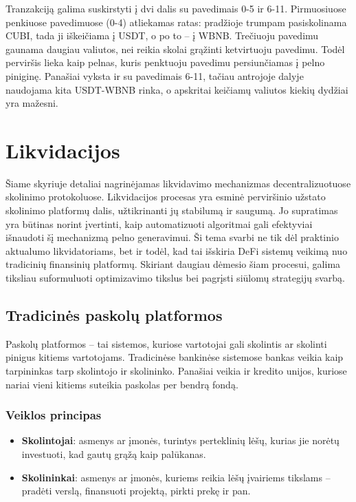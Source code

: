 \documentclass[]{VUMIFTemplateClass}
\begin{document}
Tranzakciją galima suskirstyti į dvi dalis su pavedimais 0-5 ir 6-11. Pirmuosiuose penkiuose pavedimuose (0-4) atliekamas ratas: pradžioje trumpam pasiskolinama CUBI, tada ji iškeičiama į USDT, o po to -- į WBNB. Trečiuoju pavedimu gaunama daugiau valiutos, nei reikia skolai grąžinti ketvirtuoju pavedimu. Todėl perviršis lieka kaip pelnas, kuris penktuoju pavedimu persiunčiamas į pelno piniginę. Panašiai vyksta ir su pavedimais 6-11, tačiau antrojoje dalyje naudojama kita USDT-WBNB rinka, o apskritai keičiamų valiutos kiekių dydžiai yra mažesni.

\section{Likvidacijos}

Šiame skyriuje detaliai nagrinėjamas likvidavimo mechanizmas decentralizuotuose skolinimo protokoluose. Likvidacijos procesas yra esminė perviršinio užstato skolinimo platformų dalis, užtikrinanti jų stabilumą ir saugumą. Jo supratimas yra būtinas norint įvertinti, kaip automatizuoti algoritmai gali efektyviai išnaudoti šį mechanizmą pelno generavimui. Ši tema svarbi ne tik dėl praktinio aktualumo likvidatoriams, bet ir todėl, kad tai išskiria DeFi sistemų veikimą nuo tradicinių finansinių platformų. Skiriant daugiau dėmesio šiam procesui, galima tiksliau suformuluoti optimizavimo tikslus bei pagrįsti siūlomų strategijų svarbą.

\subsection{Tradicinės paskolų platformos}
Paskolų platformos – tai sistemos, kuriose vartotojai gali skolintis ar skolinti pinigus kitiems vartotojams. Tradicinėse bankinėse sistemose bankas veikia kaip tarpininkas tarp skolintojo ir skolininko. Panašiai veikia ir kredito unijos, kuriose nariai vieni kitiems suteikia paskolas per bendrą fondą.

\subsubsection{Veiklos principas}
\begin{itemize}
    \item \textbf{Skolintojai}: asmenys ar įmonės, turintys perteklinių lėšų, kurias jie norėtų investuoti, kad gautų grąžą kaip palūkanas.
    \item \textbf{Skolininkai}: asmenys ar įmonės, kuriems reikia lėšų įvairiems tikslams – pradėti verslą, finansuoti projektą, pirkti prekę ir pan.
\end{itemize}
\end{document}
